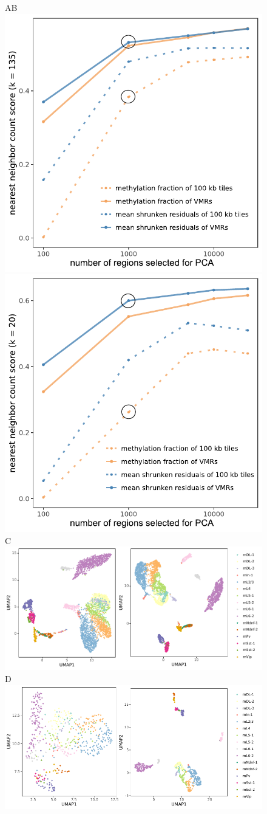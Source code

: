 \documentclass[twocolumn,10pt]{article}
\begin{document}
\begin{figure}
	\begin{center}
		A\hspace{.4\textwidth}B\hspace*{.3\textwidth}~\\
		\hspace{.3cm}\includegraphics[width=.35\textwidth]{part_leonie_git/leonie_plots/complete_135k_12cm_log.pdf}
		\hspace{1cm}\includegraphics[width=.35\textwidth]{part_leonie_git/leonie_plots/cell500_20k_12cm_log.pdf}\\
		C\hspace*{.7\textwidth}~\\
		\hspace{.3cm}\includegraphics[width=.75\textwidth]{part_leonie_git/leonie_plots/UMAP_fulldataset.pdf}\\
		D\hspace*{.7\textwidth}~\\
		\hspace{.3cm}\includegraphics[width=.75\textwidth]{part_leonie_git/leonie_plots/UMAP_reduceddataset.pdf}

\end{center}
\end{figure}
\end{document}
